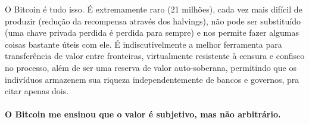 O Bitcoin é tudo isso. É extremamente raro (21 milhões), cada vez mais difícil de produzir (redução da recompensa através dos halvings), não pode ser substituído (uma chave privada perdida é perdida para sempre) e nos permite fazer algumas coisas bastante úteis com ele. É indiscutivelmente a melhor ferramenta para transferência de valor entre fronteiras, virtualmente resistente à censura e confisco no processo, além de ser uma reserva de valor auto-soberana, permitindo que os indivíduos armazenem sua riqueza independentemente de bancos e governos, pra citar apenas dois.

\paragraph{O Bitcoin me ensinou que o valor é subjetivo, mas não arbitrário.}

%
%
%
%
